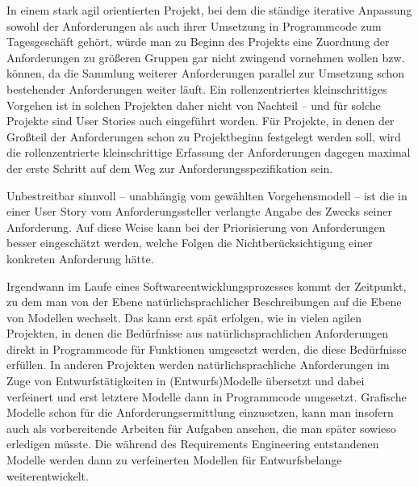 \vspace{2.5mm} %

In einem stark agil orientierten Projekt, bei dem die ständige iterative Anpassung sowohl der Anforderungen als auch ihrer Umsetzung in Programmcode zum Tages\-geschäft gehört, würde man zu Beginn des Projekts eine Zuordnung der Anforderungen zu größeren Gruppen gar nicht zwingend vornehmen wollen bzw. können, da die Sammlung weiterer Anforderungen parallel zur Umsetzung schon bestehender Anforderungen weiter läuft. Ein rollenzentriertes kleinschrittiges Vorgehen ist in solchen Projekten daher nicht von Nachteil -- und für solche Projekte sind User \mbox{Stories} auch eingeführt worden. Für Projekte, in denen der Großteil der Anforderungen schon zu Projektbeginn festgelegt werden soll, wird die rollenzentrierte kleinschrittige Erfassung der Anforderungen dagegen maximal der erste Schritt auf dem Weg zur Anforderungsspezifikation sein. %

\vspace{2.5mm} %

Unbestreitbar sinnvoll -- unabhängig vom gewählten Vorgehensmodell -- ist die in einer User Story vom Anforderungssteller verlangte Angabe des Zwecks seiner Anforderung. Auf diese Weise kann bei der Priorisierung von Anforderungen besser eingeschätzt werden, welche Folgen die Nichtberücksichtigung einer konkreten Anforderung hätte.


Irgendwann im Laufe eines Softwareentwicklungsprozesses kommt der Zeitpunkt, zu dem man von der Ebene natürlichsprachlicher Beschreibungen auf die Ebene von \mbox{Modellen} wechselt. Das kann erst spät erfolgen, wie in vielen agilen Projekten, in denen die Bedürfnisse aus natürlichsprachlichen Anforderungen direkt in Programmcode für Funktionen umgesetzt werden, die diese Bedürfnisse erfüllen. In anderen Projekten werden natürlichsprachliche Anforderungen im Zuge von Entwurfstätigkeiten in (Entwurfs)Modelle übersetzt und dabei verfeinert und erst letztere Modelle dann in Programmcode umgesetzt. Grafische Modelle schon für die Anforderungsermittlung einzusetzen, kann man insofern auch als vorbereitende Arbeiten für Aufgaben ansehen, die man später sowieso erledigen müsste. Die während des Require\-ments Engineering entstandenen Modelle werden dann zu verfeinerten Modellen für Entwurfsbelange weiterentwickelt.

\vspace{1mm} %

